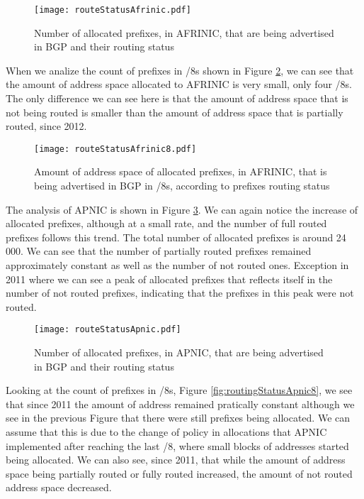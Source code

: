 \documentclass[11pt,a4paper]{scrreprt}
\begin{document}
\begin{figure}[!h]
\centering
\texttt{[image: routeStatusAfrinic.pdf]}
\caption{Number of allocated prefixes, in AFRINIC, that are being advertised in BGP and their routing status}
\label{fig:routingStatusAfrinic}
\end{figure}

When we analize the count of prefixes in /8s shown in Figure \ref{fig:routingStatusAfrinic8}, we can see that the amount of address space allocated to AFRINIC is very small, only four /8s. The only difference we can see here is that the amount of address space that is not being routed is smaller than the amount of address space that is partially routed, since 2012. 

\begin{figure}[!h]
\centering
\texttt{[image: routeStatusAfrinic8.pdf]}
\caption{Amount of address space of allocated prefixes, in AFRINIC, that is being advertised in BGP in /8s, according to prefixes routing status}
\label{fig:routingStatusAfrinic8}
\end{figure}

The analysis of APNIC is shown in Figure \ref{fig:routingStatusApnic}. We can again notice the increase of allocated prefixes, although at a small rate, and the number of full routed prefixes follows this trend. The total number of allocated prefixes is around 24 000. We can see that the number of partially routed prefixes remained approximately constant as well as the number of not routed ones. Exception in 2011 where we can see a peak of allocated prefixes that reflects itself in the number of not routed prefixes, indicating that the prefixes in this peak were not routed.  

\begin{figure}[!h]
\centering
\texttt{[image: routeStatusApnic.pdf]}
\caption{Number of allocated prefixes, in APNIC, that are being advertised in BGP and their routing status}
\label{fig:routingStatusApnic}
\end{figure}

Looking at the count of prefixes in /8s, Figure \ref{fig:routingStatusApnic8}, we see that since 2011 the amount of address remained pratically constant although we see in the previous Figure that there were still prefixes being allocated. We can assume that this is due to the change of policy in allocations that APNIC implemented after reaching the last /8, where small blocks of addresses started being allocated. We can also see, since 2011, that while the amount of address space being partially routed or fully routed increased, the amount of not routed address space decreased.
\end{document}
